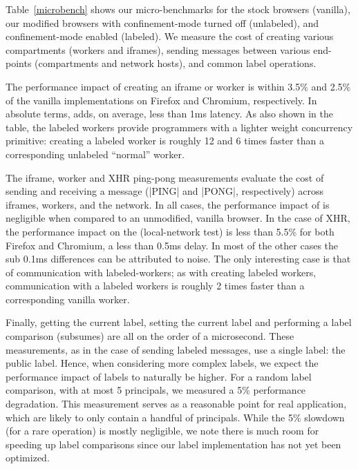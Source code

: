 Table~\ref{microbench} shows our micro-benchmarks for the stock
browsers (vanilla), our modified browsers with confinement-mode turned
off (unlabeled), and confinement-mode enabled (labeled).
%
We measure the cost of creating various compartments (workers and
iframes), sending messages between various end-points
(compartments and network hosts), and common label operations.

The performance impact of creating an iframe or worker is
within 3.5\% and 2.5\% of the vanilla implementations on Firefox and
Chromium, respectively.
%
In absolute terms, \sys{} adds, on average, less than 1ms
latency.
%
As also shown in the table, the \sys{} labeled workers provide
programmers with a lighter weight concurrency
primitive: creating a labeled worker is roughly 12 and 6 times faster
than a corresponding unlabeled ``normal'' worker.

%
The iframe, worker and XHR ping-pong measurements evaluate the cost of
sending and receiving a message (\js|PING| and \js|PONG|,
respectively) across iframes, workers, and the network.
%
In all cases, the performance impact of \sys{} is negligible when
compared to an unmodified, vanilla browser.
%
In the case of XHR, the performance impact on the
(local-network test) is less than 5.5\% for both Firefox and Chromium,
a less than 0.5ms delay.
%
In most of the other cases the sub 0.1ms differences can be
attributed to noise.
%
The only interesting case is that of communication with
labeled-workers; as with creating labeled workers, communication with
a labeled workers is roughly 2 times faster than a corresponding
vanilla worker.

Finally, getting the current label, setting the current label and
performing a label comparison (subsumes) are all on the order of a
microsecond.
%
These measurements, as in the case of sending labeled messages, use
a single label: the public label.
%
Hence, when considering more complex labels, we expect the performance
impact of labels to naturally be higher.
%
For a random label comparison, with at most 5 principals, we
measured a 5\% performance degradation.
%
This measurement serves as a reasonable point for real application,
which are likely to only contain a handful of principals.
%
While the 5\% slowdown (for a rare operation) is mostly negligible, we
note there is much room for speeding up label comparisons since our
label implementation has not yet been optimized.


